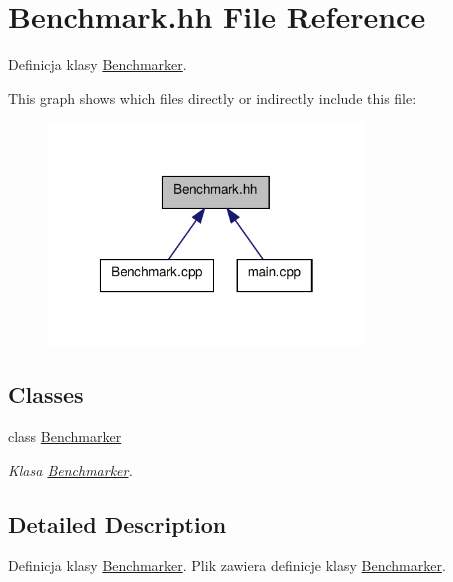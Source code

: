 \hypertarget{a00006}{\section{Benchmark.\-hh File Reference}
\label{a00006}
}


Definicja klasy \hyperlink{a00001}{Benchmarker}.  


This graph shows which files directly or indirectly include this file\-:\nopagebreak
\begin{figure}[H]
\begin{center}
\leavevmode
\includegraphics[width=238pt]{a00017}
\end{center}
\end{figure}
\subsection*{Classes}
\begin{DoxyCompactItemize}
\item 
class \hyperlink{a00001}{Benchmarker}
\begin{DoxyCompactList}\small\item\em Klasa \hyperlink{a00001}{Benchmarker}. \end{DoxyCompactList}\end{DoxyCompactItemize}


\subsection{Detailed Description}
Definicja klasy \hyperlink{a00001}{Benchmarker}. Plik zawiera definicje klasy \hyperlink{a00001}{Benchmarker}. 